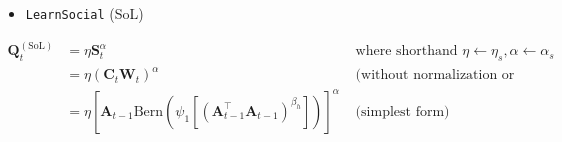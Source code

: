 \documentclass[fleqn]{article}
\begin{document}
\begin{itemize}
    \item \texttt{LearnSocial} (SoL)
\end{itemize}


\begin{align*}
    \mathbf{Q}^{\mathrm{(SoL)}}_t &=
        \eta \mathbf{S}_t ^ \alpha
        &\text{ where shorthand }
        \eta \leftarrow \eta_s,
        \alpha\leftarrow \alpha_s
        \\
        &= \eta \left(
            \mathbf{C}_t
            \mathbf{W}_t
        \right) ^ \alpha
        &\text{ (without normalization or moving averaging)}
        \\
        &= \eta \left[
            \mathbf{A}_{t-1}
            \text{Bern}\left(
                \psi_1 \left[
                    \left(
                        \mathbf{A}_{t-1}^{\top}
                        \mathbf{A}_{t-1}
                    \right)^{\beta_h}
                \right]
            \right)
        \right] ^ \alpha
        &\text{ (simplest form)}
\end{align*}
\end{document}
